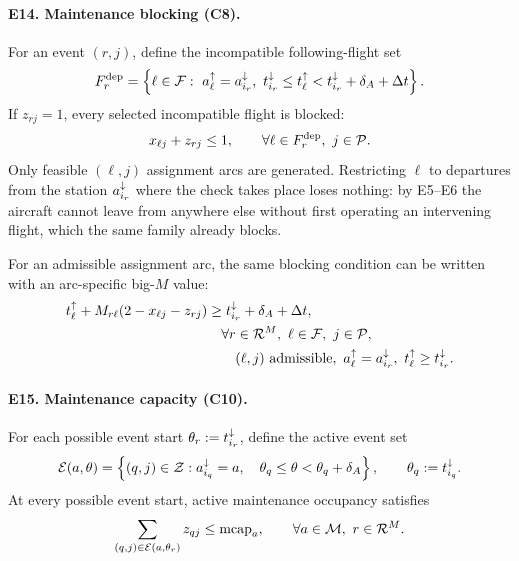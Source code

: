 \paragraph{E14. Maintenance blocking (C8).}
For an event $(r,j)$, define the incompatible following-flight set
\begin{equation}
F^{\mathrm{dep}}_{r}=\left\{\ell\in\F:\ \aD{\ell}=\aI{i_r},\ 
	\tI{i_r}\leq\tD{\ell}<\tI{i_r}+\delta_A+\Delta t\right\}.
\end{equation}
If $z_{rj}=1$, every selected incompatible flight is blocked:
\begin{equation}\label{eq:E14}
x_{\ell j}+z_{rj}\leq1,
\qquad \forall \ell\in F^{\mathrm{dep}}_{r},\ j\in\mathcal{P}.
\end{equation}
Only feasible $(\ell,j)$ assignment arcs are generated. Restricting $\ell$ to departures from
the station $a^{\downarrow}_{i_r}$ where the check takes place loses nothing: by E5--E6 the aircraft cannot
leave from anywhere else without first operating an intervening flight, which the same family
already blocks.

For an admissible assignment arc, the same blocking condition can be written
with an arc-specific big-$M$ value:
\begin{equation}\label{eq:E14_rewritten}
\begin{aligned}
\tD{\ell}+M_{r\ell}(2-x_{\ell j}-z_{rj})
&\ge \tI{i_r}+\delta_A+\Delta t,\\
&\quad \forall r\in\mathcal{R}^{M},\ \ell\in\F,\ j\in\Pc,\\
&\qquad (\ell,j)\text{ admissible},\ \aD{\ell}=\aI{i_r},\ \tD{\ell}\geq\tI{i_r}.
\end{aligned}
\end{equation}


\paragraph{E15. Maintenance capacity (C10).}
For each possible event start $\theta_r:=t^{\downarrow}_{i_r}$, define the active event set
\begin{equation}
\mathcal{E}(a,\theta)=\left\{(q,j)\in\mathcal{Z}:a^{\downarrow}_{i_q}=a,\quad
\theta_q\leq \theta<\theta_q+\delta_A\right\},
\qquad \theta_q:=t^{\downarrow}_{i_q}.
\end{equation}
At every possible event start, active maintenance occupancy satisfies
\begin{equation}\label{eq:E15_not_full}
\sum_{(q,j)\in\mathcal{E}(a,\theta_r)}z_{qj}
\leq \operatorname{mcap}_{a},
\qquad \forall a\in \mathcal{M},\ r\in\mathcal{R}^{M}.
\end{equation}

